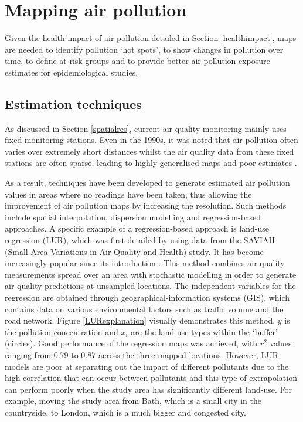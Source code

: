 \documentclass[11pt]{report}
\begin{document}
\section{Mapping air pollution} \label{mappingpollution}

Given the health impact of air pollution detailed in Section \ref{healthimpact}, maps are needed to identify pollution `hot spots', to show changes in pollution over time, to define at-risk groups and to provide better air pollution exposure estimates for epidemiological studies.

\subsection{Estimation techniques} \label{estimationtechniques}

As discussed in Section \ref{spatialres}, current air quality monitoring mainly uses fixed monitoring stations. Even in the 1990s, it was noted that air pollution often varies over extremely short distances whilst the air quality data from these fixed stations are often sparse, leading to highly generalised maps and poor estimates \citep{Briggs1997mappingGIS}.

As a result, techniques have been developed to generate estimated air pollution values in areas where no readings have been taken, thus allowing the improvement of air pollution maps by increasing the resolution. Such methods include spatial interpolation, dispersion modelling and regression-based approaches. A specific example of a regression-based approach is land-use regression (LUR), which was first detailed by \cite{Briggs1997mappingGIS} using data from the SAVIAH (Small Area Variations in Air Quality and Health) study. It has become increasingly popular since its introduction \citep{Hoek2008LUR}. This method combines air quality measurements spread over an area with stochastic modelling in order to generate air quality predictions at unsampled locations. The independent variables for the regression are obtained through geographical-information systems (GIS), which contains data on various environmental factors such as traffic volume and the road network. Figure \ref{LURexplanation} visually demonstrates this method. $y$ is the pollution concentration and $x_i$ are the land-use types within the `buffer' (circles). Good performance of the regression maps was achieved, with $r^2$ values ranging from 0.79 to 0.87 across the three mapped locations. However, LUR models are poor at separating out the impact of different pollutants due to the high correlation that can occur between pollutants \citep{Hoek2008LUR} and this type of extrapolation can perform poorly when the study area has significantly different land-use. For example, moving the study area from Bath, which is a small city in the countryside, to London, which is a much bigger and congested city.
\end{document}

